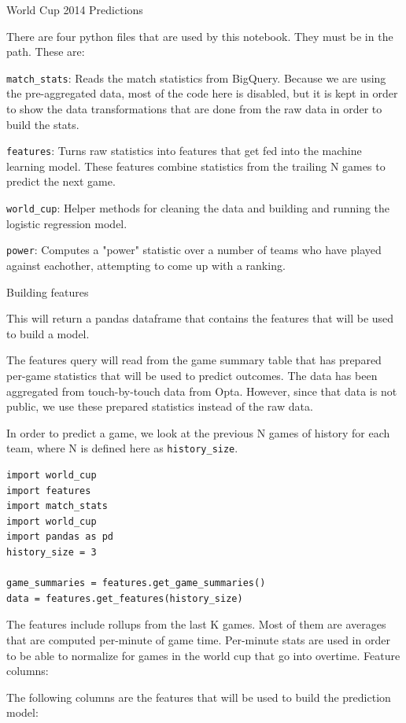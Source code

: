 \documentclass[12pt,fleqn]{article}\usepackage{../common}
\begin{document}
World Cup 2014 Predictions

There are four python files that are used by this notebook. They must be in
the path. These are:

\verb!match_stats!: Reads the match statistics from BigQuery. Because we are using
the pre-aggregated data, most of the code here is disabled, but it is kept
in order to show the data transformations that are done from the raw data
in order to build the stats.

\verb!features!: Turns raw statistics into features that get fed into the machine
learning model. These features combine statistics from the trailing N games
to predict the next game.

\verb!world_cup!: Helper methods for cleaning the data and building and running
the logistic regression model.

\verb!power!: Computes a "power" statistic over a number of teams who have played
against eachother, attempting to come up with a ranking.

Building features

This will return a pandas dataframe that contains the features that will be
used to build a model.

The features query will read from the game summary table that has prepared
per-game statistics that will be used to predict outcomes. The data has
been aggregated from touch-by-touch data from Opta. However, since that
data is not public, we use these prepared statistics instead of the raw
data.

In order to predict a game, we look at the previous N games of history for
each team, where N is defined here as \verb!history_size!.

\begin{verbatim}
import world_cup
import features
import match_stats
import world_cup
import pandas as pd
history_size = 3

game_summaries = features.get_game_summaries()
data = features.get_features(history_size)
\end{verbatim}

The features include rollups from the last K games. Most of them are
averages that are computed per-minute of game time. Per-minute stats are
used in order to be able to normalize for games in the world cup that go
into overtime.  Feature columns:

The following columns are the features that will be used to build the
prediction model:
\end{document}
